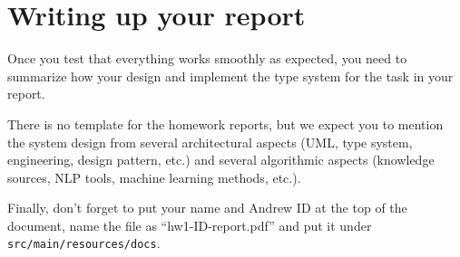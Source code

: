 
\section{Writing up your report}

Once you test that everything works smoothly as expected, you need to summarize
how your design and implement the type system for the task in your report.

There is no template for the homework reports, but we expect you to mention the system
design from several architectural aspects (UML, type system, engineering, design
pattern, etc.) and several algorithmic aspects (knowledge sources, NLP tools,
machine learning methods, etc.).

Finally, don't forget to put your name and Andrew ID at the top of the document,
name the file as ``hw1-ID-report.pdf'' and put it under
\texttt{src/main/resources/docs}.
